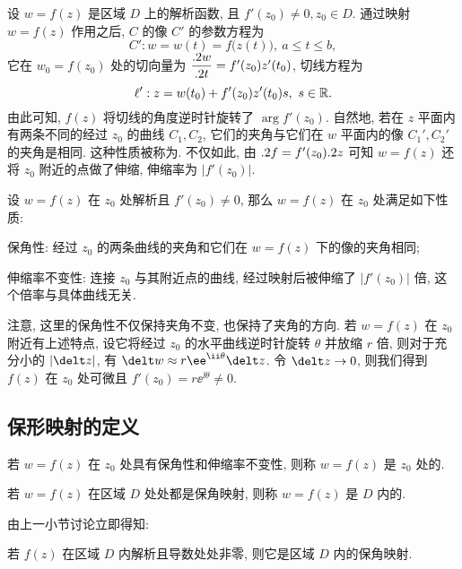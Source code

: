 设 $w=f(z)$ 是区域 $D$ 上的解析函数, 且 $f'(z_0)\neq 0,z_0\in D$.
通过映射 $w=f(z)$ 作用之后, $C$ 的像 $C'$ 的参数方程为
\[
  C':w=w(t)=f\bigl(z(t)\bigr),\ a\le t\le b,
\]
它在 $w_0=f(z_0)$ 处的切向量为 $\dfrac{.2 w}{.2 t}=f'(z_0) z'(t_0)$, 切线方程为
\[
  \ell': z=w(t_0)+f'(z_0) z'(t_0)s,\ s\in{\mathbb{R}}.
\]
由此可知, $f(z)$ 将切线的角度逆时针旋转了 $\arg f'(z_0)$.
自然地, 若在 $z$ 平面内有两条不同的经过 $z_0$ 的曲线 $C_1,C_2$, 它们的夹角与它们在 $w$ 平面内的像 $C_1',C_2'$ 的夹角是相同.
这种性质被称为.
不仅如此, 由 $.2 f=f'(z_0).2 z$ 可知 $w=f(z)$ 还将 $z_0$ 附近的点做了伸缩, 伸缩率为 $|f'(z_0)|$.

\begin{theorem}
  设 $w=f(z)$ 在 $z_0$ 处解析且 $f'(z_0)\neq0$, 那么 $w=f(z)$ 在 $z_0$ 处满足如下性质:
  \begin{enuma}
    \item 保角性: 经过 $z_0$ 的两条曲线的夹角和它们在 $w=f(z)$ 下的像的夹角相同;
    \item 伸缩率不变性: 连接 $z_0$ 与其附近点的曲线, 经过映射后被伸缩了 $|f'(z_0)|$ 倍, 这个倍率与具体曲线无关.\footnotemark
  \end{enuma}
\end{theorem}

注意, 这里的保角性不仅保持夹角不变, 也保持了夹角的方向.
若 $w=f(z)$ 在 $z_0$ 附近有上述特点, 设它将经过 $z_0$ 的水平曲线逆时针旋转 $\theta$ 并放缩 $r$ 倍, 则对于充分小的 $|\delt z|$, 有 $\delt w\approx r\ee^{\ii\theta}\delt z$.
令 $\delt z\ra 0$, 则我们得到 $f(z)$ 在 $z_0$ 处可微且 $f'(z_0)=r\ee^{\ii\theta}\neq0$.


\subsection{保形映射的定义}

\begin{definition}
  \begin{enuma}
    \item 若 $w=f(z)$ 在 $z_0$ 处具有保角性和伸缩率不变性, 则称 $w=f(z)$ 是 $z_0$ 处的.
    \item 若 $w=f(z)$ 在区域 $D$ 处处都是保角映射, 则称 $w=f(z)$ 是 $D$ 内的.
  \end{enuma}
\end{definition}

由上一小节讨论立即得知:
\begin{theorem}
  若 $f(z)$ 在区域 $D$ 内解析且导数处处非零, 则它是区域 $D$ 内的保角映射.
\end{theorem}

